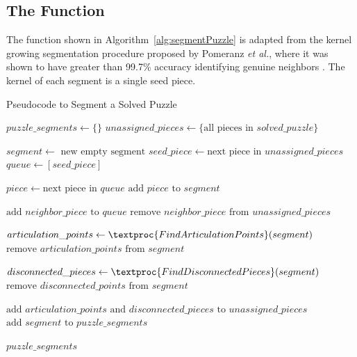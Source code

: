 \subsection{The  Function}\label{sec:segmentPuzzle}

The  function shown in Algorithm~\ref{alg:segmentPuzzle} is adapted from the kernel growing segmentation procedure proposed by Pomeranz \textit{et al.}, where it was shown to have greater than 99.7\% accuracy identifying genuine neighbors \cite{pomeranz2011}. The kernel of each segment is a single seed piece.

\begin{algorithm}[tb]
\caption{Pseudocode to Segment a Solved Puzzle}\label{alg:segmentPuzzle}
\begin{algorithmic}[1]
    \State $puzzle\_segments \gets \{ \}$
    \State $unassigned\_pieces \gets \{ \text{all pieces in } solved\_puzzle \}$
\item[]
        \State $segment \gets \text{ new empty segment}$
        \State $seed\_piece \gets \text{next piece in } unassigned\_pieces$
        \State $queue \gets [seed\_piece]$
\item[]
            \State $piece \gets \text{next piece in } queue$
            \State $\text{add } piece \text{ to } segment$
\item[]
            		\State $\text{add } neighbor\_piece \text{ to } \textit{queue}$
            		\State $\text{remove } neighbor\_piece \text{ from } unassigned\_pieces$
            	\EndIf
            \EndFor
        \EndWhile
\item[]
        \State $articulation\_points \gets \textproc{FindArticulationPoints}(segment)$
        \State $\text{remove } articulation\_points \text{ from } \textit{segment}$
\item[]
		\State $disconnected\_pieces \gets \textproc{FindDisconnectedPieces}(segment)$ 
		\State $\text{remove } disconnected\_points \text{ from } segment$
\item[]
        \State $\text{add } \textit{articulation\_points} \text{ and } \textit{disconnected\_pieces} \text{ to } \textit{unassigned\_pieces}$               	
		\State $\text{add } segment \text{ to } puzzle\_segments$	
    \EndWhile
\item[]
    \State \Return $puzzle\_segments$
\EndFunction
\end{algorithmic}
\end{algorithm}

